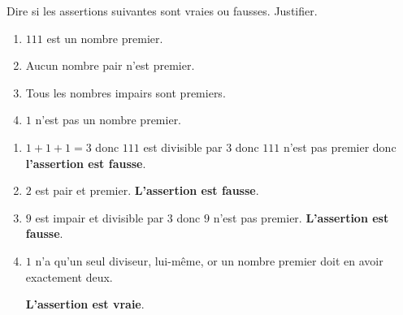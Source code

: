 \begin{exercice*}
    Dire si les assertions suivantes sont vraies ou fausses. Justifier.
    \begin{enumerate}
        \item $111$ est un nombre premier.
        \item Aucun nombre pair n'est premier.
        \item Tous les nombres impairs sont premiers.
        \item $1$ n'est pas un nombre premier.
    \end{enumerate}
\end{exercice*}
\begin{corrige}
    \begin{enumerate}
        \item $1+1+1 = 3$ donc $111$ est divisible par $3$ donc $111$ n'est pas premier donc \textbf{l'assertion est fausse}.
        \item $2$ est pair et premier. \textbf{L'assertion est fausse}.
        \item $9$ est impair et divisible par $3$ donc $9$ n'est pas premier. \textbf{L'assertion est fausse}.
        \item $1$ n'a qu'un seul diviseur, lui-même, or un nombre premier doit en avoir exactement deux.
        
        \textbf{L'assertion est vraie}.
    \end{enumerate}
\end{corrige}

